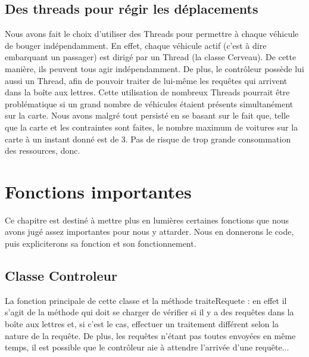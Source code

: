\documentclass[a4paper, titlepage]{report}
\begin{document}
\section{Des threads pour régir les déplacements}

Nous avons fait le choix d'utiliser des Threads pour permettre à chaque véhicule de bouger indépendamment. En effet, chaque véhicule actif (c'est à dire embarquant un passager) est dirigé par un Thread (la classe Cerveau). De cette manière, ils peuvent tous agir indépendamment. De plus, le contrôleur possède lui aussi un Thread, afin de pouvoir traiter de lui-même les requêtes qui arrivent dans la boîte aux lettres. Cette utilisation de nombreux Threads pourrait être problématique si un grand nombre de véhicules étaient présents simultanément sur la carte. Nous avons malgré tout persisté en se basant sur le fait que, telle que la carte et les contraintes sont faites, le nombre maximum de voitures sur la carte à un instant donné est de 3. Pas de risque de trop grande consommation des ressources, donc.


\chapter{Fonctions importantes}
Ce chapitre est destiné à mettre plus en lumières certaines fonctions que nous avons jugé assez importantes pour nous y attarder. Nous en donnerons le code, puis expliciterons sa fonction et son fonctionnement.
\section{Classe Controleur}
La fonction principale de cette classe et la méthode traiteRequete : en effet il s'agit de la méthode qui doit se charger de vérifier si il y a des requêtes dans la boîte aux lettres et, si c'est le cas, effectuer un traitement différent selon la nature de la requête. De plus, les requêtes n'étant pas toutes envoyées en même temps, il est possible que le contrôleur aie à attendre l'arrivée d'une requête...\\
\end{document}
